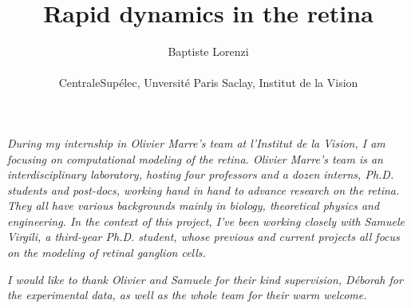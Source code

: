 \documentclass[12pt]{article}
\title{Rapid dynamics in the retina}
\author{Baptiste Lorenzi\\
    \\
    \normalsize{CentraleSupélec, Unversité Paris Saclay, Institut de la
        Vision}\\}
\date{}
\begin{document}

\baselineskip24pt


\maketitle


\textit{During my internship in Olivier Marre's team at l'Institut de la
    Vision, I am
    focusing on computational modeling of the retina. Olivier Marre's team is
    an
    interdisciplinary laboratory, hosting four professors and a dozen 
    interns,
    Ph.D. students and post-docs, working hand in hand to advance research
    on the retina. They all have various backgrounds mainly in biology,
    theoretical physics and engineering. In the context of this project, I've
    been
    working
    closely with Samuele Virgili, a third-year Ph.D. student, whose previous
    and
    current projects all focus on the modeling of retinal ganglion cells.}

\textit{I would like to thank Olivier and Samuele for their kind supervision,
    Déborah for the experimental data,
    as well as the whole team for their
    warm welcome.}
\newline

\tableofcontents
















\clearpage
\end{document}
